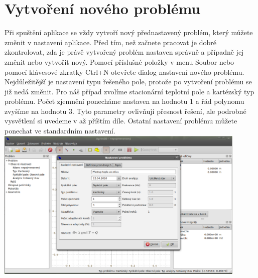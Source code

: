 \documentclass[a4paper, oneside]{article}
\begin{document}
\section{Vytvoření nového problému}
Při spuštění aplikace se vždy vytvoří nový přednastavený problém, který můžete změnit v nastavení aplikace. Před tím, než začnete pracovat je dobré zkontrolovat, zda je právě vytvořený problém nastaven správně a případně jej změnit nebo vytvořit nový. Pomocí příslušné položky v menu Soubor nebo pomocí klávesové zkratky Ctrl+N otevřete dialog nastavení nového problému. Nejdůležitější je nastavení typu řešeného pole, protože po vytvoření problému se již nedá změnit. Pro náš případ zvolíme stacionární teplotní pole a kartézský typ problému. Počet zjemnění ponecháme nastaven na hodnotu 1 a řád polynomu zvyšíme na hodnotu 3. Tyto parametry ovlivňují přesnost řešení, ale podrobné vysvětlení si uvedeme v až příštím díle. Ostatní nastavení problému můžete ponechat ve standardním nastavení.\\
\includegraphics[width=12cm]{nastaveni_problemu.eps}
\end{document}
